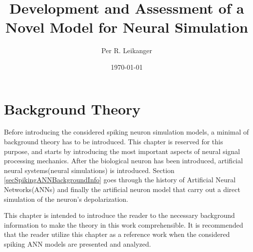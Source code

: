 \documentclass[b5paper,12 pt]{report}
\author{Per R. Leikanger}
\title{Development and Assessment of a Novel Model for Neural Simulation}
\date{\today}
\begin{document}
   



\pagestyle{empty} %

\maketitle







\pagestyle{empty} 

\tableofcontents %
\cleardoublepage %

\listoffigures

\setcounter{page}{1} %
\pagestyle{plain} %















\chapter{Background Theory}
	Before introducing the considered spiking neuron simulation models, a minimal of background theory has to be introduced.
	This chapter is reserved for this purpose, and starts by introducing the most important aspects of neural signal processing mechanics.
	After the biological neuron has been introduced, artificial neural systems(neural simulations) is introduced.
	Section \ref{secSpikingANNBackgroundInfo} goes through the history of Artificial Neural Networks(ANNs) and finally the artificial neuron model that carry out a direct simulation of the neuron's depolarization.

	This chapter is intended to introduce the reader to the necessary background information to make the theory in this work comprehensible.
	It is recommended that the reader utilize this chapter as a reference work when the considered spiking ANN models are presented and analyzed.
\end{document}
